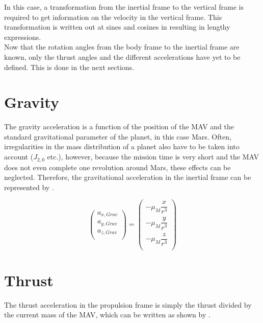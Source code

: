 \noindent
In this case, a transformation from the inertial frame to the vertical frame is required to get information on the velocity in the vertical frame. This transformation is written out at sines and cosines in  resulting in lengthy expressions. \\

\noindent
Now that the rotation angles from the body frame to the inertial frame are known, only the thrust angles and the different accelerations have yet to be defined. This is done in the next sections.


\section{Gravity}
\label{sec:gravityModel}
The gravity acceleration is a function of the position of the \ac{MAV} and the standard gravitational parameter of the planet, in this case Mars. Often, irregularities in the mass distribution of a planet also have to be taken into account ($J_{2,0}$ etc.), however, because the mission time is very short and the \ac{MAV} does not even complete one revolution around Mars, these effects can be neglected. Therefore, the gravitational acceleration in the inertial frame can be represented by .

\begin{equation} \label{eq:gravityModel}
\begin{pmatrix}
a_{x,Grav}\\
a_{y,Grav}\\
a_{z,Grav}\\
\end{pmatrix}
=
\begin{pmatrix}
-\mu_{M}\dfrac{x}{r^{3}}\\
-\mu_{M}\dfrac{y}{r^{3}}\\
-\mu_{M}\dfrac{z}{r^{3}}\\
\end{pmatrix}
\end{equation}




\section{Thrust}
\label{sec:thrustModel}
The thrust acceleration in the propulsion frame is simply the thrust divided by the current mass of the \ac{MAV}, which can be written as shown by .

